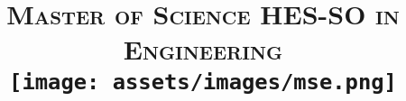 \usepackage{setspace}
\usepackage{microtype}
\onehalfspacing
\usepackage{amssymb}
\usepackage{pifont}


\usepackage{fancyhdr}

\pagestyle{fancy}

\lhead{\small\assignmentTitle\ }
\lfoot{}
\rfoot{}

\renewcommand\headrulewidth{0.5pt}


\usepackage{titlesec}

\titleformat{\section}{\Large\bfseries}{\thesection}{6pt}{}


\author{\textbf{\assignmentAuthorName}} %
\date{} %

\title{
    \textsc{\LARGE Master of Science HES-SO in Engineering}\\[1.5cm] %
    \texttt{[image: assets/images/mse.png]}\\
    \thispagestyle{empty} %
    \vspace{0.1\textheight} %
    \textbf{\assignmentTitle}\\[4pt]
    \ifdef{\assignmentDueDate}{{\assignmentDueDate}\\}{} %
    \ifdef{\assignmentClassInstructor}{{\large \textit{\assignmentClassInstructor}}}{} %
    \vspace{0.32\textheight} %
}

